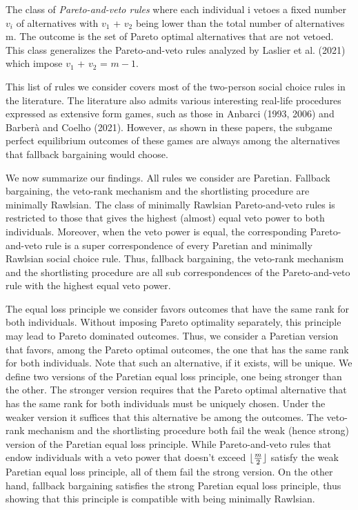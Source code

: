 \documentclass[version=3.21, pagesize, twoside=off, bibliography=totoc, DIV=calc, fontsize=12pt, a4paper]{scrartcl}
\begin{document}
The class of \textit{Pareto-and-veto rules} where each individual i vetoes a fixed number $v_i$ of alternatives with $v_1$ + $v_2$ being lower than the total number of alternatives m. The outcome is the set of Pareto optimal alternatives that are not vetoed. This class generalizes the Pareto-and-veto rules analyzed by Laslier et al. (2021) which impose $v_1$ + $v_2$ = $m-1$.
  
This list of rules we consider covers most of the two-person social choice rules in the literature. The literature also admits various interesting real-life procedures expressed as extensive form games, such as those in Anbarci (1993, 2006) and Barberà and Coelho (2021). However, as shown in these papers, the subgame perfect equilibrium outcomes of these games are always among the alternatives that fallback bargaining would choose. 

We now summarize our findings. All rules we consider are Paretian. Fallback bargaining, the veto-rank mechanism and the shortlisting procedure are minimally Rawlsian. The class of minimally Rawlsian Pareto-and-veto rules is restricted to those that gives the highest (almost) equal veto power to both individuals. Moreover, when the veto power is equal, the corresponding Pareto-and-veto rule is a super correspondence of every Paretian and minimally Rawlsian social choice rule. Thus, fallback bargaining, the veto-rank mechanism and the shortlisting procedure are all sub correspondences of the Pareto-and-veto rule with the highest equal veto power.

The equal loss principle we consider favors outcomes that have the same rank for both individuals. Without imposing Pareto optimality separately, this principle may lead to Pareto dominated outcomes. Thus, we consider a Paretian version that favors, among the Pareto optimal outcomes, the one that has the same rank for both individuals. Note that such an alternative, if it exists, will be unique. We define two versions of the Paretian equal loss principle, one being stronger than the other. The stronger version requires that the Pareto optimal alternative that has the same rank for both individuals must be uniquely chosen. Under the weaker version it suffices that this alternative be among the outcomes. The veto-rank mechanism and the shortlisting procedure both fail the weak (hence strong) version of the Paretian equal loss principle. While Pareto-and-veto rules that endow individuals with a veto power that doesn't exceed $\lfloor\frac{m}{2}\rfloor$ satisfy the weak Paretian equal loss principle, all of them fail the strong version. On the other hand, fallback bargaining satisfies the strong Paretian equal loss principle, thus showing that this principle is compatible with being minimally Rawlsian.
\end{document}
